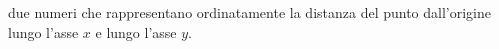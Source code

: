 due numeri che rappresentano ordinatamente la distanza del punto
dall'origine lungo l'asse $x$ e lungo l'asse $y$. %